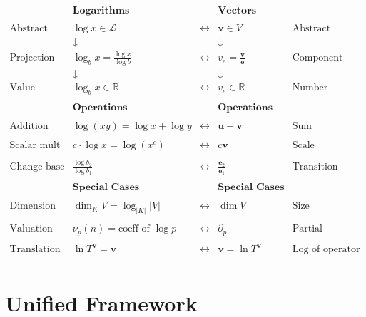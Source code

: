 \documentclass[11pt]{article}
\begin{document}
\[
\begin{array}{ccccc}
& \textbf{Logarithms} & & \textbf{Vectors} & \\
& & & & \\
\text{Abstract} & \log x \in \mathcal{L} & \longleftrightarrow & \mathbf{v} \in V & \text{Abstract} \\
& \downarrow & & \downarrow & \\
\text{Projection} & \log_b x = \frac{\log x}{\log b} & \longleftrightarrow & v_e = \frac{\mathbf{v}}{\mathbf{e}} & \text{Component} \\
& \downarrow & & \downarrow & \\
\text{Value} & \log_b x \in \mathbb{R} & \longleftrightarrow & v_e \in \mathbb{R} & \text{Number} \\
& & & & \\
& \textbf{Operations} & & \textbf{Operations} & \\
& & & & \\
\text{Addition} & \log(xy) = \log x + \log y & \longleftrightarrow & \mathbf{u} + \mathbf{v} & \text{Sum} \\
& & & & \\
\text{Scalar mult} & c \cdot \log x = \log(x^c) & \longleftrightarrow & c \mathbf{v} & \text{Scale} \\
& & & & \\
\text{Change base} & \frac{\log b_2}{\log b_1} & \longleftrightarrow & \frac{\mathbf{e}_2}{\mathbf{e}_1} & \text{Transition} \\
& & & & \\
& \textbf{Special Cases} & & \textbf{Special Cases} & \\
& & & & \\
\text{Dimension} & \dim_K V = \log_{|K|} |V| & \longleftrightarrow & \dim V & \text{Size} \\
& & & & \\
\text{Valuation} & \nu_p(n) = \text{coeff of } \log p & \longleftrightarrow & \partial_p & \text{Partial} \\
& & & & \\
\text{Translation} & \ln T^{\mathbf{v}} = \mathbf{v} & \longleftrightarrow & \mathbf{v} = \ln T^{\mathbf{v}} & \text{Log of operator} \\
\end{array}
\]

\section{Unified Framework}
\label{sec:unified}
\end{document}

